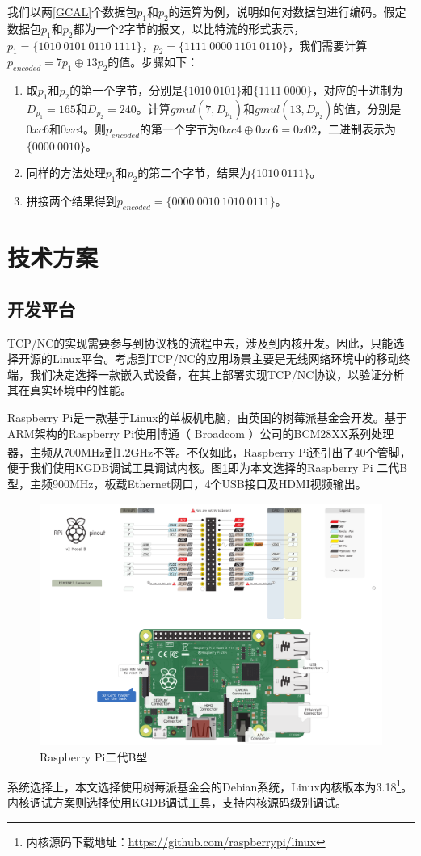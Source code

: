 \par
我们以两\ref{GCAL}个数据包$p_{1}$和$p_{2}$的运算为例，说明如何对数据包进行编码。假定数据包$p_{1}$和$p_{2}$都为一个2字节的报文，以比特流的形式表示，$p_{1}=\{1010\ 0101\ 0110\ 1111\}$，$p_{2}=\{1111\ 0000\ 1101\ 0110\}$，我们需要计算$p_{encoded}=7p_{1} \oplus 13p_{2}$的值。步骤如下：
\begin{enumerate}[fullwidth,itemindent=2em,label=(\arabic*)]
	\item 取$p_{1}$和$p_{2}$的第一个字节，分别是$\{1010\ 0101\}$和$\{1111\ 0000\}$，对应的十进制为$D_{p_1}=165$和$D_{p_2}=240$。计算$gmul\left(7,D_{p_1}\right)$和$gmul\left(13,D_{p_2}\right)$的值，分别是$0xc6$和$0xc4$。则$p_{encoded}$的第一个字节为$0xc4 \oplus 0xc6=0x02$，二进制表示为$\{0000\ 0010\}$。
	\item 同样的方法处理$p_{1}$和$p_{2}$的第二个字节，结果为$\{1010\ 0111\}$。
	\item 拼接两个结果得到$p_{encoded}=\{0000\ 0010\ 1010\ 0111\}$。
\end{enumerate}
\section{技术方案}
\subsection{开发平台}
TCP/NC的实现需要参与到协议栈的流程中去，涉及到内核开发。因此，只能选择开源的Linux平台。考虑到TCP/NC的应用场景主要是无线网络环境中的移动终端，我们决定选择一款嵌入式设备，在其上部署实现TCP/NC协议，以验证分析其在真实环境中的性能。
\par
Raspberry Pi是一款基于Linux的单板机电脑，由英国的树莓派基金会开发。基于ARM架构的Raspberry Pi使用博通（ Broadcom ）公司的BCM28XX系列处理器，主频从700MHz到1.2GHz不等\textsuperscript{\cite{rasp}}。不仅如此，Raspberry Pi还引出了40个管脚，便于我们使用KGDB调试工具调试内核。图\ref{RASP_EPS}即为本文选择的Raspberry Pi 二代B型，主频900MHz，板载Ethernet网口，4个USB接口及HDMI视频输出。
\begin{figure}[htbp]
	\centering
\includegraphics[width=6in]{figures/rasp.pdf}
\caption{Raspberry Pi二代B型}
\label{RASP_EPS}
\end{figure}
系统选择上，本文选择使用树莓派基金会的Debian系统，Linux内核版本为3.18\footnote{内核源码下载地址：\url{https://github.com/raspberrypi/linux}}。内核调试方案则选择使用KGDB调试工具，支持内核源码级别调试。
